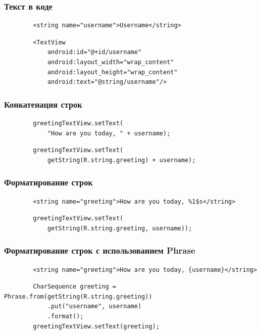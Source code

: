 \documentclass{beamer}
\begin{document}
\begin{frame}[fragile]
    \frametitle{Текст в коде}
    \begin{verbatim}
        <string name="username">Username</string>
    \end{verbatim}
    \begin{verbatim}
        <TextView
            android:id="@+id/username"
            android:layout_width="wrap_content"
            android:layout_height="wrap_content"
            android:text="@string/username"/>
    \end{verbatim}
\end{frame}

\begin{frame}[fragile]
    \frametitle{Конкатенация строк}
    \begin{verbatim}
        greetingTextView.setText(
            "How are you today, " + username);
    \end{verbatim}
    \begin{verbatim}
        greetingTextView.setText(
            getString(R.string.greeting) + username);
    \end{verbatim}
\end{frame}

\begin{frame}[fragile]
    \frametitle{Форматирование строк}
    \begin{verbatim}
        <string name="greeting">How are you today, %1$s</string>
    \end{verbatim}
    \begin{verbatim}
        greetingTextView.setText(
            getString(R.string.greeting, username));
    \end{verbatim}
\end{frame}

\begin{frame}[fragile]
    \frametitle{Форматирование строк с использованием Phrase}
    \begin{verbatim}
        <string name="greeting">How are you today, {username}</string>
    \end{verbatim}
    \begin{verbatim}
        CharSequence greeting = Phrase.from(getString(R.string.greeting))
            .put("username", username)
            .format();
        greetingTextView.setText(greeting);
    \end{verbatim}
\end{frame}
\end{document}
